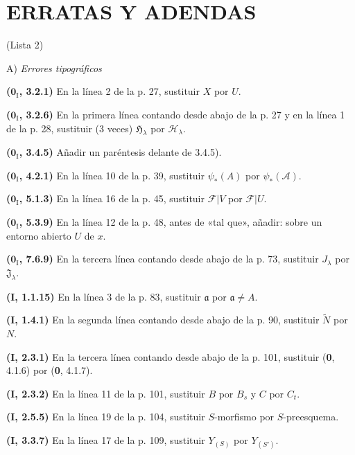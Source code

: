 \documentclass[10pt,oneside]{book}
\newcommand{\oldpage}[2][]{\setcounter{footnote}{0}\marginpar{\scriptsize\textbf{#1}~|~#2}\ignorespaces}
\begin{document}
\clearpage
\thispagestyle{empty}
\null
\clearpage

\oldpage[III]{217}
\section*{ERRATAS Y ADENDAS}
\begin{center}
(Lista 2)

\medskip
A) \emph{Errores tipográficos}
\end{center}

\noindent\textbf{($\mathbf 0_{\mathrm I}$, 3.2.1)} En la línea 2 de la p. 27, sustituir
$X$ por $U$.

\noindent\textbf{($\mathbf 0_{\mathrm I}$, 3.2.6)} En la primera línea contando desde
abajo de la p. 27 y en la línea 1 de la p. 28, sustituir (3 veces)
$\mathfrak H_\lambda$ por $\mathscr H_\lambda$.

\noindent\textbf{($\mathbf 0_{\mathrm I}$, 3.4.5)} Añadir un paréntesis delante de
3.4.5).

\noindent\textbf{($\mathbf 0_{\mathrm I}$, 4.2.1)} En la línea 10 de la p. 39,
sustituir $\psi_*(A)$ por $\psi_*(\mathscr A)$.

\noindent\textbf{($\mathbf 0_{\mathrm I}$, 5.1.3)} En la línea 16 de la p. 45,
sustituir $\mathscr F|V$ por $\mathscr F|U$.

\noindent\textbf{($\mathbf 0_{\mathrm I}$, 5.3.9)} En la línea 12 de la p. 48, antes
de «tal que», añadir: sobre un entorno abierto $U$ de $x$.

\noindent\textbf{($\mathbf 0_{\mathrm I}$, 7.6.9)} En la tercera línea contando desde
abajo de la p. 73, sustituir $J_\lambda$ por $\mathfrak J_\lambda$.

\noindent\textbf{(I, 1.1.15)} En la línea 3 de la p. 83, sustituir
$\mathfrak a$ por $\mathfrak a\ne A$.

\noindent\textbf{(I, 1.4.1)} En la segunda línea contando desde abajo de la
p. 90, sustituir $\widetilde N$ por $N$.

\noindent\textbf{(I, 2.3.1)} En la tercera línea contando desde abajo de la
p. 101, sustituir (\textbf 0, 4.1.6) por (\textbf 0, 4.1.7).

\noindent\textbf{(I, 2.3.2)} En la línea 11 de la p. 101, sustituir $B$ por
$B_s$ y $C$ por $C_t$.

\noindent\textbf{(I, 2.5.5)} En la línea 19 de la p. 104, sustituir
$S$-morfismo por $S$-preesquema.

\noindent\textbf{(I, 3.3.7)} En la línea 17 de la p. 109, sustituir
$Y_{(S)}$ por $Y_{(S')}$.
\end{document}
